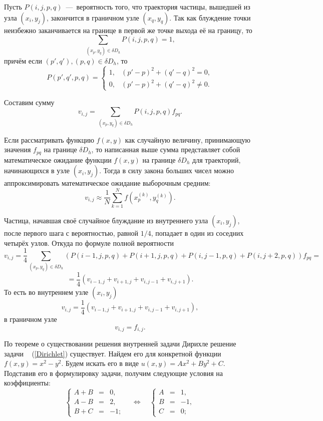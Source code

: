 Пусть \( P(i,j,p,q) \)~---~вероятность того, что траектория частицы, 
 вышедшей из узла \( (x_i,y_j) \), закончится в граничном узле 
 \( (x_q,y_q) \). Так как блуждение точки неизбежно заканчивается на 
 границе в первой же точке выхода её на границу, то
\[
 \sum\limits_{(x_p,y_q)\in\delta D_h}P(i,j,p,q)=1,
\]
причём если \( (p',q'), (p,q)\in\delta D_h \), то
\[
P(p',q',p,q)=\begin{cases}
1,&(p'-p)^2+(q'-q)^2=0,\\
0,&(p'-p)^2+(q'-q)^2\ne0.
\end{cases}
\]

Составим сумму
\[
 v_{i,j}=\sum\limits_{(x_p,y_q)\in\delta D_h}P(i,j,p,q)f_{pq}.
\]

Если рассматривать функцию \( f(x,y) \) как случайную величину, принимающую 
 значения \( f_{pq} \) на границе \( \delta D_h \), то написанная выше 
 сумма представляет собой математическое ожидание функции \( f(x,y) \) на 
 границе \( \delta D_h \) для траекторий, начинающихся в узле \( (x_i,y_j) \). 
 Тогда в силу закона больших чисел можно аппроксимировать математическое 
 ожидание выборочным средним:
\[
 v_{i, j} \approx \dfrac{1}{N} \sum\limits_{k = 1}^{N} f \left( x_p^{(k)}, 
 y_q^{(k)} \right).
\]

Частица, начавшая своё случайное блуждание из внутреннего узла 
 \( (x_i,y_j) \), после первого шага с вероятностью, равной \( 1/4 \), 
 попадает в один из соседних четырёх узлов. Откуда по формуле полной 
 вероятности
\[
 v_{i, j} = \dfrac{1}{4} \sum\limits_{(x_p,y_q) \in\delta D_h} 
 (P(i - 1, j, p, q) + P(i + 1, j, p, q) + P(i, j - 1, p, q) + 
 P(i, j + 2, p, q))f_{p q} =
\]
\[
 = \dfrac{1}{4}(v_{i - 1, j} + v_{i + 1, j} + v_{i, j - 1} + v_{i,j + 1}).
\]
То есть во внутреннем узле \( (x_i, y_j) \)
\begin{equation} \label{internal_new}
    v_{i, j} = \dfrac{1}{4}(v_{i - 1, j} + v_{i + 1, j} + v_{i, j - 1} + 
     v_{i, j + 1}),
\end{equation}
в граничном узле
\begin{equation} \label{borders_new}
    v_{i, j} = f_{i, j}.
\end{equation}
 

По теореме о существовании решения внутренней задачи Дирихле решение 
 задачи ~ (\ref{Dirichlet}) существует. Найдем его для конкретной функции 
 \( f(x,y)=x^2-y^2 \). Будем искать его в виде \( u(x,y)=Ax^2+By^2+C \). 
 Подставив его в формулировку задачи, получим следующие условия на 
 коэффициенты:
\[
 \left\lbrace
 \begin{array}{rcl}
    A + B & = & 0,\\
    A - B & = & 2,\\
    B + C & = & -1;
\end{array}
\right.\quad\Longleftrightarrow\quad
\left\lbrace
\begin{array}{rcl}
A&=&1,\\
B&=&-1,\\
C&=&0;
\end{array}
\right.
\]

